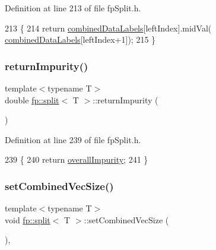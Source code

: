 Definition at line 213 of file fp\+Split.\+h.


\begin{DoxyCode}
213                                               \{
214                     \textcolor{keywordflow}{return} \hyperlink{classfp_1_1split_ac8f54cf4a42335814e10e351c49e3c32}{combinedDataLabels}[leftIndex].midVal(
      \hyperlink{classfp_1_1split_ac8f54cf4a42335814e10e351c49e3c32}{combinedDataLabels}[leftIndex+1]);
215                 \}
\end{DoxyCode}
\mbox{\label{classfp_1_1split_a8501016c02cb2c36b3d40ee120da872e}} 
\subsubsection{\texorpdfstring{return\+Impurity()}{returnImpurity()}}
{\footnotesize\ttfamily template$<$typename T$>$ \\
double \hyperlink{classfp_1_1split}{fp\+::split}$<$ T $>$\+::return\+Impurity (\begin{DoxyParamCaption}{ }\end{DoxyParamCaption})\hspace{0.3cm}{\ttfamily [inline]}}



Definition at line 239 of file fp\+Split.\+h.


\begin{DoxyCode}
239                                               \{
240                     \textcolor{keywordflow}{return} \hyperlink{classfp_1_1split_a1eba74d8afed2852da3eb004afe76bb7}{overallImpurity};
241                 \}
\end{DoxyCode}
\mbox{\label{classfp_1_1split_a9c1560ae01a536ed0245d667ee7d5fb6}} 
\subsubsection{\texorpdfstring{set\+Combined\+Vec\+Size()}{setCombinedVecSize()}}
{\footnotesize\ttfamily template$<$typename T$>$ \\
void \hyperlink{classfp_1_1split}{fp\+::split}$<$ T $>$\+::set\+Combined\+Vec\+Size (\begin{DoxyParamCaption}{ }\end{DoxyParamCaption})\hspace{0.3cm}{\ttfamily [inline]}, {\ttfamily [protected]}}



